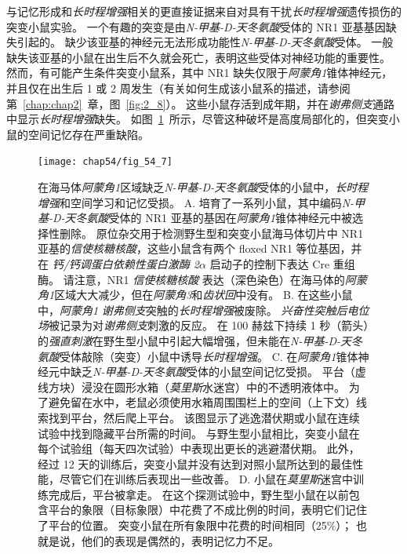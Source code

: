 与记忆形成和\textit{长时程增强}相关的更直接证据来自对具有干扰\textit{长时程增强}遗传损伤的突变小鼠实验。
一个有趣的突变是由\textit{N-甲基-D-天冬氨酸}受体的 NR1 亚基基因缺失引起的。
缺少该亚基的神经元无法形成功能性\textit{N-甲基-D-天冬氨酸}受体。
一般缺失该亚基的小鼠在出生后不久就会死亡，表明这些受体对神经功能的重要性。
然而，有可能产生条件突变小鼠系，其中 NR1 缺失仅限于\textit{阿蒙角1}锥体神经元，并且仅在出生后 1 或 2 周发生（有关如何生成该小鼠系的描述，请参阅第~\ref{chap:chap2}~章，图~\ref{fig:2_8}）。
这些小鼠存活到成年期，并在\textit{谢弗侧支}通路中显示\textit{长时程增强}缺失。
如图~\ref{fig:54_7}~所示，尽管这种破坏是高度局部化的，但突变小鼠的空间记忆存在严重缺陷。


\begin{figure}[htbp]
	\centering
	\texttt{[image: chap54/fig\_54\_7]}
	\caption{在海马体\textit{阿蒙角1}区域缺乏\textit{N-甲基-D-天冬氨酸}受体的小鼠中，\textit{长时程增强}和空间学习和记忆受损。
		A. 培育了一系列小鼠，其中编码\textit{N-甲基-D-天冬氨酸}受体的 NR1 亚基的基因在\textit{阿蒙角1}锥体神经元中被选择性删除。
		原位杂交用于检测野生型和突变小鼠海马体切片中 NR1 亚基的\textit{信使核糖核酸}，这些小鼠含有两个 floxed NR1 等位基因，并在 \textit{钙/钙调蛋白依赖性蛋白激酶 2}$\alpha$ 启动子的控制下表达 Cre 重组酶。
		请注意，NR1 \textit{信使核糖核酸} 表达（深色染色）在海马体的\textit{阿蒙角1}区域大大减少，但在\textit{阿蒙角3}和\textit{齿状回}中没有。
		B. 在这些小鼠中，\textit{阿蒙角1} \textit{谢弗侧支}突触的\textit{长时程增强}被废除。
		\textit{兴奋性突触后电位场}被记录为对\textit{谢弗侧支}刺激的反应。
		在 100 赫兹下持续 1 秒（箭头）的\textit{强直刺激}在野生型小鼠中引起大幅增强，但未能在\textit{N-甲基-D-天冬氨酸}受体敲除（突变）小鼠中诱导\textit{长时程增强}。
		C. 在\textit{阿蒙角1}锥体神经元中缺乏\textit{N-甲基-D-天冬氨酸}受体的小鼠空间记忆受损。
		平台（虚线方块）浸没在圆形水箱（\textit{莫里斯}水迷宫）中的不透明液体中。
		为了避免留在水中，老鼠必须使用水箱周围围栏上的空间（上下文）线索找到平台，然后爬上平台。
		该图显示了逃逸潜伏期或小鼠在连续试验中找到隐藏平台所需的时间。
		与野生型小鼠相比，突变小鼠在每个试验组（每天四次试验）中表现出更长的逃避潜伏期。
		此外，经过 12 天的训练后，突变小鼠并没有达到对照小鼠所达到的最佳性能，尽管它们在训练后表现出一些改善。
		D. 小鼠在\textit{莫里斯}迷宫中训练完成后，平台被拿走。
		在这个探测试验中，野生型小鼠在以前包含平台的象限（目标象限）中花费了不成比例的时间，表明它们记住了平台的位置。
		突变小鼠在所有象限中花费的时间相同（25\%）；
		也就是说，他们的表现是偶然的，表明记忆力不足。}
	\label{fig:54_7}
\end{figure}


